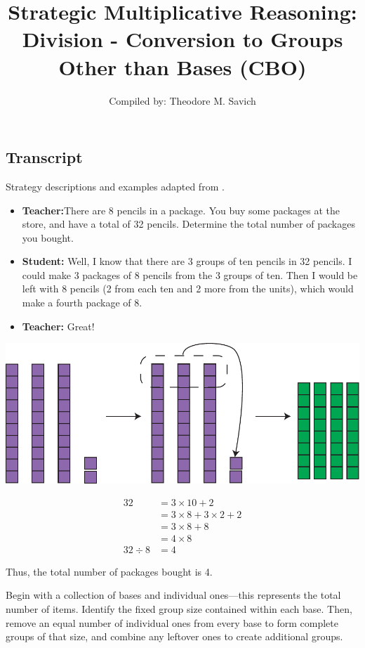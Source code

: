 \documentclass[11pt]{article}
\title{Strategic Multiplicative Reasoning: Division - Conversion to Groups Other than Bases (CBO)}
\author{Compiled by: Theodore M. Savich}
\begin{document}
\maketitle
\subsection*{Transcript}
Strategy descriptions and examples adapted from \textcite{HackenbergCourseNotes}. 


\begin{itemize}
    \item \textbf{Teacher:}There are 8 pencils in a package. You buy some packages at the store, and have a total of 32 pencils. Determine the total number of packages you bought.
    \item \textbf{Student:} Well, I know that there are 3 groups of ten pencils in 32 pencils. I could make 3 packages of 8 pencils from the 3 groups of ten. Then I would be left with 8 pencils (2 from each ten and 2 more from the units), which would make a fourth package of 8.
    \item \textbf{Teacher:} Great!
\end{itemize}


\includegraphics[width=.8\textwidth]{images/Easy_Pictures/SMR_DIV_CGOB/PDF/SMR_DIV_CGOB.pdf}

\begin{align*}
    32 &= 3\times 10 + 2 \\
    &= 3\times 8 +3\times 2 + 2 \\
    &= 3\times 8 + 8 \\
    &= 4\times 8 \\
    32 \div 8 &= 4 
    \end{align*}

    Thus, the total number of packages bought is 4.


    Begin with a collection of bases and individual ones—this represents the total number of items. Identify the fixed group size contained within each base. Then, remove an equal number of individual ones from every base to form complete groups of that size, and combine any leftover ones to create additional groups.
\end{document}
